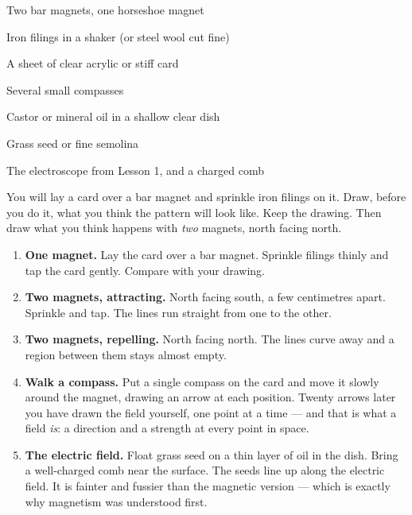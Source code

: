 



\begin{materials}
\item Two bar magnets, one horseshoe magnet
\item Iron filings in a shaker (or steel wool cut fine)
\item A sheet of clear acrylic or stiff card
\item Several small compasses
\item Castor or mineral oil in a shallow clear dish
\item Grass seed or fine semolina
\item The electroscope from Lesson 1, and a charged comb
\end{materials}

\begin{predict}
You will lay a card over a bar magnet and sprinkle iron filings on it. Draw,
before you do it, what you think the pattern will look like. Keep the drawing.
Then draw what you think happens with \emph{two} magnets, north facing north.
\end{predict}

\begin{enumerate}
\item \textbf{One magnet.} Lay the card over a bar magnet. Sprinkle filings
  thinly and tap the card gently. Compare with your drawing.
\item \textbf{Two magnets, attracting.} North facing south, a few centimetres
  apart. Sprinkle and tap. The lines run straight from one to the other.
\item \textbf{Two magnets, repelling.} North facing north. The lines curve away
  and a region between them stays almost empty.
\item \textbf{Walk a compass.} Put a single compass on the card and move it
  slowly around the magnet, drawing an arrow at each position. Twenty arrows
  later you have drawn the field yourself, one point at a time --- and that is
  what a field \emph{is}: a direction and a strength at every point in space.
\item \textbf{The electric field.} Float grass seed on a thin layer of oil in
  the dish. Bring a well-charged comb near the surface. The seeds line up along
  the electric field. It is fainter and fussier than the magnetic version ---
  which is exactly why magnetism was understood first.
\end{enumerate}


